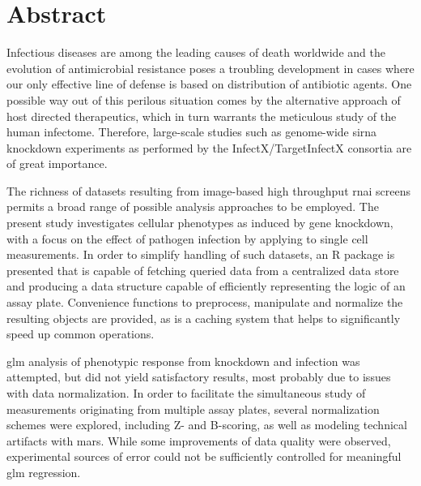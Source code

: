 \chapter{Abstract}

Infectious diseases are among the leading causes of death worldwide and the evolution of antimicrobial resistance poses a troubling development in cases where our only effective line of defense is based on distribution of antibiotic agents. One possible way out of this perilous situation comes by the alternative approach of host directed therapeutics, which in turn warrants the meticulous study of the human infectome. Therefore, large-scale studies such as genome-wide \acrshort{sirna} knockdown experiments as performed by the InfectX\slash TargetInfectX consortia are of great importance.

The richness of datasets resulting from image-based high throughput \acrshort{rnai} screens permits a broad range of possible analysis approaches to be employed. The present study investigates cellular phenotypes as induced by gene knockdown, with a focus on the effect of pathogen infection by applying  to single cell measurements. In order to simplify handling of such datasets, an R package is presented that is capable of fetching queried data from a centralized data store and producing a data structure capable of efficiently representing the logic of an assay plate. Convenience functions to preprocess, manipulate and normalize the resulting objects are provided, as is a caching system that helps to significantly speed up common operations.

\acrshort{glm} analysis of phenotypic response from knockdown and infection was attempted, but did not yield satisfactory results, most probably due to issues with data normalization. In order to facilitate the simultaneous study of measurements originating from multiple assay plates, several normalization schemes were explored, including Z- and B-scoring, as well as modeling technical artifacts with \acrfull{mars}. While some improvements of data quality were observed, experimental sources of error could not be sufficiently controlled for meaningful \acrshort{glm} regression.